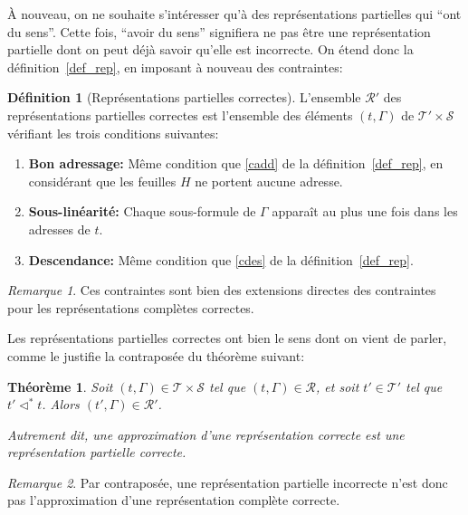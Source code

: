 \documentclass[11pt,a4paper]{article}
\theoremstyle{plain}
\newtheorem{theorem}{Théorème}
\theoremstyle{definition}
\newtheorem{definition}{Définition}
\theoremstyle{remark}
\newtheorem{remark}{Remarque}
\newcommand*{\sequent}{\Gamma}
\newcommand*{\sequents}{\ensuremath{\mathcal{S}}}
\newcommand*{\trees}{\ensuremath{\mathcal{T}}}
\newcommand*{\treespartial}{\ensuremath{\mathcal{T'}}}
\newcommand*{\representationslarge}{\ensuremath{\trees \times \sequents}}
\newcommand*{\representations}{\ensuremath{\mathcal{R}}}
\newcommand*{\representationspartiallarge}{\ensuremath{\treespartial \times \sequents}}
\newcommand*{\representationspartial}{\ensuremath{\mathcal{R'}}}
\newcommand*{\relapprox}{\ensuremath{\triangleleft}}
\newcommand*{\relapproxlarge}{\ensuremath{\relapprox^*}}
\newcommand*{\unknown}{H}
\begin{document}
À nouveau, on ne souhaite s'intéresser qu'à des représentations partielles qui ``ont du sens''. Cette fois, ``avoir du sens'' signifiera ne pas être une représentation partielle dont on peut déjà savoir qu'elle est incorrecte. On étend donc la définition~\ref{def_rep}, en imposant à nouveau des contraintes:

\begin{definition}[Représentations partielles correctes]
    \label{def_rep_partial}
    L'ensemble \representationspartial{} des représentations partielles correctes est l'ensemble des éléments $(t, \sequent)$ de $\representationspartiallarge$ vérifiant les trois conditions suivantes:
    
    \begin{enumerate}
    \item\label{caddpartial} \textbf{Bon adressage:} Même condition que \ref{cadd} de la définition~\ref{def_rep}, en considérant que les feuilles $\unknown$ ne portent aucune adresse.
    \item\label{clinpartial} \textbf{Sous-linéarité:} Chaque sous-formule de $\sequent$ apparaît au plus une fois dans les adresses de $t$.
    \item\label{cdespartial} \textbf{Descendance:} Même condition que \ref{cdes} de la définition~\ref{def_rep}.
    \end{enumerate}
\end{definition}

\begin{remark}
    Ces contraintes sont bien des extensions directes des contraintes pour les représentations complètes correctes.
\end{remark}

Les représentations partielles correctes ont bien le sens dont on vient de parler, comme le justifie la contraposée du théorème suivant:

\begin{theorem}
    \label{approxofcorrect}
    Soit $(t, \sequent) \in \representationslarge$ tel que $(t, \sequent) \in \representations$, et soit $t' \in \treespartial$ tel que $t' \relapproxlarge t$. Alors $(t', \sequent) \in \representationspartial$.
    
    Autrement dit, une approximation d'une représentation correcte est une représentation partielle correcte.
\end{theorem}

\begin{remark}
    Par contraposée, une représentation partielle incorrecte n'est donc pas l'approximation d'une représentation complète correcte.
\end{remark}
\end{document}
